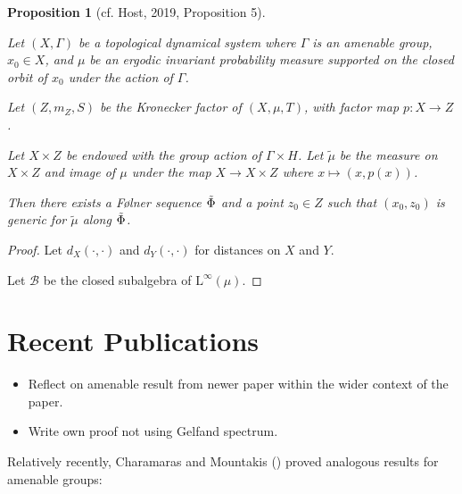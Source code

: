 \documentclass[
  british,
]{article}
\providecommand{\tightlist}{%
  \setlength{\itemsep}{0pt}\setlength{\parskip}{0pt}}
\theoremstyle{plain}
\newtheorem{proposition}{Proposition}[section]
\theoremstyle{definition}
\theoremstyle{plain}
\theoremstyle{remark}
\newcommand{\AmenableGroup}{{\Gamma}}
\newcommand{\Folner}[1][\vphantom{}]{{\Phi}_{#1}}
\newcommand{\KroneckerFactorMap}{p}
\newcommand{\KroneckerGroup}{{H}}
\newcommand{\KroneckerMeasure}{{m_Z}}
\newcommand{\KroneckerSpace}{{Z}}
\newcommand{\KroneckerSpaceElement}{{z}}
\newcommand{\Measure}{{\mu}}
\newcommand{\ShiftSpace}{{X}}
\newcommand{\ShiftSpaceElement}{{x}}
\newcommand{\FurstenbergSystem}{(\ShiftSpace,\Measure,T)}
\newcommand{\KroneckerFactor}{{(\KroneckerSpace,\KroneckerMeasure,S)}}
\begin{document}
\begin{proposition}[{cf. Host, 2019, Proposition
5}]\protect\hypertarget{prp-KroneckerGeneric}{}\label{prp-KroneckerGeneric}

{Let \((\ShiftSpace,\AmenableGroup)\) be a topological dynamical system
where \(\AmenableGroup\) is an amenable group,
\(\ShiftSpaceElement_0\in\ShiftSpace\), and \(\Measure\) be an ergodic
invariant probability measure supported on the closed orbit of
\(\ShiftSpaceElement_0\) under the action of \(\AmenableGroup\).}

Let \(\KroneckerFactor\) be the Kronecker factor of
\(\FurstenbergSystem\), with factor map
\(\KroneckerFactorMap: \ShiftSpace\rightarrow\KroneckerSpace\).

Let \(\ShiftSpace\times\KroneckerSpace\) be endowed with the group
action of \(\AmenableGroup\times\KroneckerGroup\). Let
\(\tilde\Measure\) be the measure on
\(\ShiftSpace\times\KroneckerSpace\) and image of \(\Measure\) under the
map \(\ShiftSpace\rightarrow\ShiftSpace\times\KroneckerSpace\) where
\(\ShiftSpaceElement\mapsto(\ShiftSpaceElement,\KroneckerFactorMap(\ShiftSpaceElement))\).

Then there exists a Følner sequence \(\tilde{\Folner}\) and a point
\(\KroneckerSpaceElement_0\in\KroneckerSpace\) such that
\((\ShiftSpaceElement_0,\KroneckerSpaceElement_0)\) is generic for
\(\tilde{\Measure}\) along \(\tilde{\Folner}\).

\end{proposition}

\begin{proof}
Let \(d_X(\cdot,\cdot)\) and \(d_Y(\cdot,\cdot)\) for distances on \(X\)
and \(Y\).

Let \(\mathcal{B}\) be the closed subalgebra of
\(\text{L}^\infty(\Measure)\).
\end{proof}

\section{Recent Publications}\label{recent-publications}

\begin{itemize}
\tightlist
\item
  Reflect on amenable result from newer paper within the wider context
  of the paper.
\item
  Write own proof not using Gelfand spectrum.
\end{itemize}

Relatively recently, Charamaras and Mountakis
() proved
analogous results for amenable groups:
\end{document}
